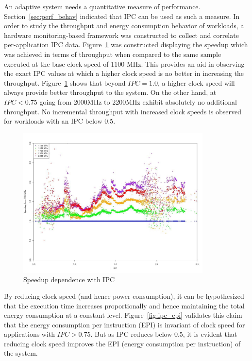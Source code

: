 An adaptive system needs a quantitative measure of performance. Section~\ref{sec:perf_behav} indicated
that IPC can be used as such a measure. In order to study the throughput and energy consumption behavior of
workloads, a hardware monitoring-based framework was constructed to
collect and correlate per-application IPC data. Figure~\ref{fig:ipc_speedup} 
was constructed displaying the speedup which was achieved in terms of throughput when compared to the same 
sample executed at the base clock speed of 1100 MHz. This provides an aid in observing the exact IPC
values at which a higher clock speed is no better in increasing the throughput. Figure~\ref{fig:ipc_speedup}
shows that beyond $IPC = 1.0$, a higher clock speed will always provide better throughput to the system. On the
other hand, at $IPC < 0.75$ going from 2000MHz to 2200MHz exhibit absolutely no additional throughput.
No incremental throughput with increased clock speeds is observed for workloads with an IPC below 0.5.
\begin{figure}[h!]
  \begin{center}
    \includegraphics[height=3in]{figures/ipc_speedup.jpg}%
    \caption{Speedup dependence with IPC}
    \label{fig:ipc_speedup}
  \end{center}
\end{figure}

By reducing clock speed (and hence power consumption), it can be hypothesized that the execution time
increases proportionally and hence maintaining the total energy consumption at a constant level.
Figure~\ref{fig:ipc_epi} validates this claim that 
the energy consumption per instruction (EPI) is invariant of clock speed for applications with $IPC > 0.75$. 
But as IPC reduces below 0.5, it is evident that reducing clock speed improves the EPI 
(energy consumption per instruction) of the system.

